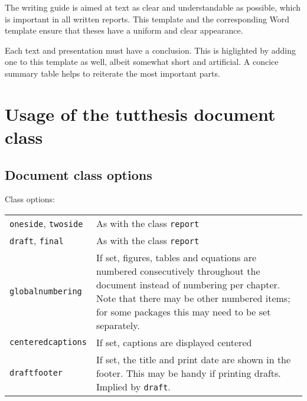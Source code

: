 \documentclass[twoside,draftfooter]{tutthesis} %
\newif\ifnameyear
\begin{document}
The writing guide is aimed at text as clear and understandable as possible, which is important in all written reports.
This template and the corresponding Word template ensure that theses have a uniform and clear appearance.

Each text and presentation must have a conclusion.
This is higlighted by adding one to this template as well, albeit somewhat short and artificial.
A concice summary table helps to reiterate the most important parts.




\ifnameyear
  
\else
  
\fi





\appendix

\chapter{Usage of the tutthesis document class}
\label{ch:classdocumentation}

\section{Document class options}

Class options:

\begin{tabular}[h]{@{} p{} p{} @{}}
\texttt{oneside}, \texttt{twoside} & As with the class \texttt{report} \\
\texttt{draft}, \texttt{final} & As with the class \texttt{report} \\
\texttt{globalnumbering} & If set, figures, tables and equations are numbered consecutively throughout the document instead of numbering per chapter. Note that there may be other numbered items; for some packages this may need to be set separately. \\
\texttt{centeredcaptions} & If set, captions are displayed centered\\
\texttt{draftfooter} & If set, the title and print date are shown in the footer. This may be handy if printing drafts. Implied by \texttt{draft}.
\end{tabular}
\end{document}
